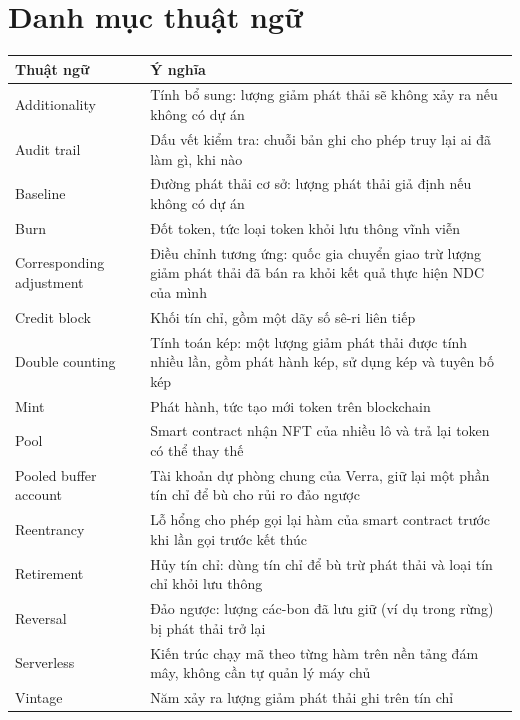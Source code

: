 \documentclass[a4paper,oneside]{report}
\begin{document}
\chapter*{Danh mục thuật ngữ}
{}
\begin{longtable}{@{}p{4.2cm}p{9.9cm}@{}}
\toprule
\textbf{Thuật ngữ} & \textbf{Ý nghĩa} \\
\midrule
\endhead
\bottomrule
\endfoot
Additionality   & Tính bổ sung: lượng giảm phát thải sẽ không xảy ra nếu không có dự án \\
Audit trail     & Dấu vết kiểm tra: chuỗi bản ghi cho phép truy lại ai đã làm gì, khi nào \\
Baseline        & Đường phát thải cơ sở: lượng phát thải giả định nếu không có dự án \\
Burn            & Đốt token, tức loại token khỏi lưu thông vĩnh viễn \\
Corresponding adjustment & Điều chỉnh tương ứng: quốc gia chuyển giao trừ lượng giảm phát thải đã bán ra khỏi kết quả thực hiện NDC của mình \\
Credit block    & Khối tín chỉ, gồm một dãy số sê-ri liên tiếp \\
Double counting & Tính toán kép: một lượng giảm phát thải được tính nhiều lần, gồm phát hành kép, sử dụng kép và tuyên bố kép \\
Mint            & Phát hành, tức tạo mới token trên blockchain \\
Pool            & Smart contract nhận NFT của nhiều lô và trả lại token có thể thay thế \\
Pooled buffer account & Tài khoản dự phòng chung của Verra, giữ lại một phần tín chỉ để bù cho rủi ro đảo ngược \\
Reentrancy      & Lỗ hổng cho phép gọi lại hàm của smart contract trước khi lần gọi trước kết thúc \\
Retirement      & Hủy tín chỉ: dùng tín chỉ để bù trừ phát thải và loại tín chỉ khỏi lưu thông \\
Reversal        & Đảo ngược: lượng các-bon đã lưu giữ (ví dụ trong rừng) bị phát thải trở lại \\
Serverless      & Kiến trúc chạy mã theo từng hàm trên nền tảng đám mây, không cần tự quản lý máy chủ \\
Vintage         & Năm xảy ra lượng giảm phát thải ghi trên tín chỉ \\
\end{longtable}
\end{document}
